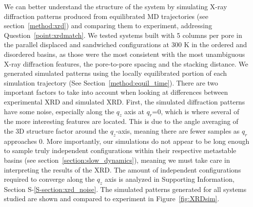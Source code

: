 \documentclass[journal=jpcbfk,manuscript=article]{achemso}
\begin{document}
  We can better understand the structure of the system by simulating X-ray
  diffraction patterns produced from equilibrated MD trajectories (see
  section~\ref{method:xrd}) and comparing them to experiment, addressing
  Question~\ref{point:xrdmatch}. We tested systems built with 5 columns per pore
  in the parallel displaced and sandwiched configurations at
  300 K in the ordered and disordered basins, as those were the most consistent
  with the most unambiguous X-ray diffraction features, the pore-to-pore spacing
  and the stacking distance.  We generated simulated patterns using the locally
  equilibrated portion of each simulation trajectory (See
  Section~\ref{method:equil_time}). There are two important factors to take into
  account when looking at differences between experimental XRD and simulated XRD.
  First, the simulated diffraction patterns have some noise, especially along the
  $q_z$ axis at $q_r$=0, which is where several of the more interesting features
  are located. This is due to the angle averaging of the 3D structure factor
  around the $q_z$-axis, meaning there are fewer samples as $q_r$ approaches 0.
  More importantly, our simulations do not appear to be long enough to sample truly
  independent configurations within their respective metastable basins (see
  section~\ref{section:slow_dynamics}), meaning we must take care in interpreting
  the results of the XRD. The amount of independent configurations required to 
  converge along the $q_z$ axis is analyzed in Supporting Information, 
  Section S-\ref{S-section:xrd_noise}. The simulated patterns generated for all
  systems studied are shown and compared to experiment in Figure~\ref{fig:XRDsim}.
\end{document}
